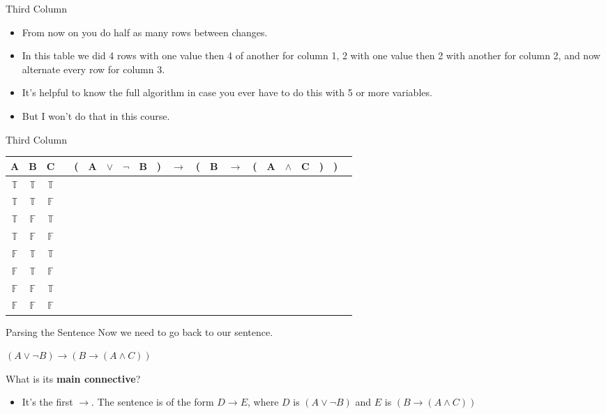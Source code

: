 \documentclass[
  ignorenonframetext,
]{beamer}
\providecommand{\tightlist}{%
  \setlength{\itemsep}{0pt}\setlength{\parskip}{0pt}}
\renewcommand{\,}{\text{, }}
\renewenvironment*{quote}	
	{\list{}{\rightmargin   \leftmargin} \item } 	
	{\endlist }
\def\True{\mathbb{T}}
\def\False{\mathbb{F}}
\begin{document}
\begin{frame}{Third Column}
\protect\hypertarget{third-column}{}
\begin{itemize}
\tightlist
\item
  From now on you do half as many rows between changes.
\item
  In this table we did 4 rows with one value then 4 of another for
  column 1, 2 with one value then 2 with another for column 2, and now
  alternate every row for column 3.
\item
  It's helpful to know the full algorithm in case you ever have to do
  this with 5 or more variables.
\item
  But I won't do that in this course.
\end{itemize}
\end{frame}

\begin{frame}{Third Column}
\protect\hypertarget{third-column-1}{}
\begin{center}
\begin{tabular}{@{ }c@{ }@{ }c@{ }@{ }c | c@{ }@{}c@{}@{ }c@{ }@{ }c@{ }@{ }c@{ }@{ }c@{ }@{}c@{}@{ }c@{ }@{}c@{}@{ }c@{ }@{ }c@{ }@{}c@{}@{ }c@{ }@{ }c@{ }@{ }c@{ }@{}c@{}@{}c@{}@{ }c}
A & B & C &  & ( & A & $\lor$ & $\neg$ & B & ) & $\rightarrow$ & ( & B & $\rightarrow$ & ( & A & $\wedge$ & C & ) & ) & \\
\hline 
 $\True$ & $\True$ & $\True$ &  & \\
 $\True$ & $\True$ & $\False$ &  & \\
 $\True$ & $\False$ & $\True$ &  & \\
 $\True$ & $\False$ & $\False$ &  &  \\
 $\False$ & $\True$ & $\True$ &  & \\
 $\False$ & $\True$ & $\False$ &  & \\
 $\False$ & $\False$ & $\True$ &  & \\
 $\False$ & $\False$ & $\False$ &  & \\
\end{tabular}
\end{center}
\end{frame}

\begin{frame}{Parsing the Sentence}
\protect\hypertarget{parsing-the-sentence}{}
Now we need to go back to our sentence.

\begin{quote}
\((A \vee \neg B) \rightarrow (B \rightarrow (A \wedge C))\)
\end{quote}

What is its \textbf{main connective}? \pause \bigskip

\begin{itemize}
\tightlist
\item
  It's the first \(\rightarrow\). The sentence is of the form
  \(D \rightarrow E\), where \(D\) is \((A \vee \neg B)\) and \(E\) is
  \((B \rightarrow (A \wedge C))\)
\end{itemize}
\end{frame}
\end{document}
